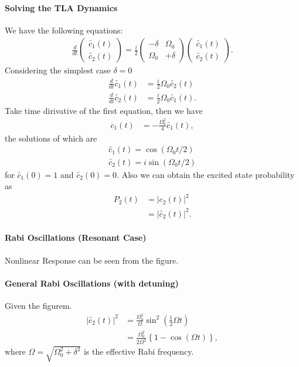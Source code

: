 \documentclass[../../note.tex]{subfiles}
\begin{document}
\paragraph{Solving the TLA Dynamics}
We have the following equations:
\begin{align}
    \frac{d}{d t} \left(\begin{matrix}
        \tilde{c_1}(t) \\
        \tilde{c_2}(t)
    \end{matrix}\right) =  \frac{i}{2} \left(\begin{matrix}
        -\delta & \Omega_0 \\
        \Omega_0 & + \delta
    \end{matrix}\right) \left(\begin{matrix}
        \tilde{c_1}(t) \\
        \tilde{c_2}(t)
    \end{matrix}\right).
\end{align}
Considering the simplest case $\delta = 0$
\begin{align}
    \frac{d}{d t} \tilde{c_1}(t)
    &= \frac{i}{2} \Omega_0 \tilde{c_2}(t) \\
    \frac{d}{d t} \tilde{c_2}(t)
    &= \frac{i}{2} \Omega_0 \tilde{c_1}(t).
\end{align}
Take time dirivative of the first equation, then we have
\begin{align}
    \ddot{c_1}(t)
    &= - \frac{\Omega_0^2}{4} \tilde{c_1}(t),
\end{align}
the solutions of which are
\begin{align}
    \tilde{c_1}(t) = \cos(\Omega_0 t/2) \\
    \tilde{c_2}(t) = i \sin(\Omega_0 t/2)
\end{align}
for $\tilde{c_1}(0) = 1$ and $\tilde{c_2}(0) = 0$. Also we can obtain the excited state probability as
\begin{align}
    P_2(t)
    &= \vert c_2(t) \vert^2 \\
    &= \vert \tilde{c_2}(t) \vert^2.
\end{align}

\paragraph{Rabi Oscillations (Resonant Case)}
Nonlinear Response can be seen from the figure.

\paragraph{General Rabi Oscillations (with detuning)}
Given the figurem.
\begin{align}
    \vert \tilde{c_2}(t) \vert^2
    &= \frac{\Omega_0^2}{\Omega} \sin^2\left(\frac{1}{2}\Omega t\right) \\
    &= \frac{\Omega_0^2}{2 \Omega^2} \left\{1-\cos(\Omega t)\right\},
\end{align}
where $\Omega = \sqrt{\Omega_0^2 + \delta^2}$ is the effective Rabi frequency.
\end{document}
